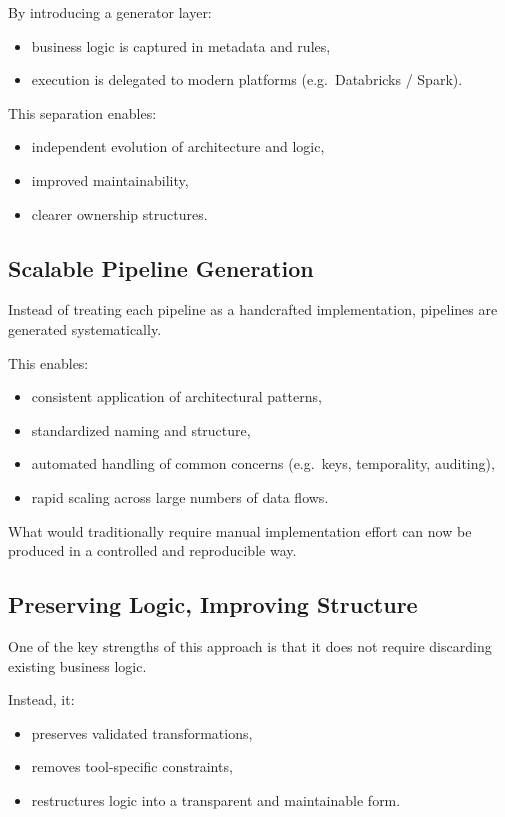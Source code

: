 \documentclass[11pt,a4paper]{article}
\begin{document}
By introducing a generator layer:
\begin{itemize}
  \item business logic is captured in metadata and rules,
  \item execution is delegated to modern platforms (e.g.\ Databricks / Spark).
\end{itemize}

This separation enables:
\begin{itemize}
  \item independent evolution of architecture and logic,
  \item improved maintainability,
  \item clearer ownership structures.
\end{itemize}

\subsection{Scalable Pipeline Generation}

Instead of treating each pipeline as a handcrafted implementation, pipelines are generated systematically.

This enables:
\begin{itemize}
  \item consistent application of architectural patterns,
  \item standardized naming and structure,
  \item automated handling of common concerns (e.g.\ keys, temporality, auditing),
  \item rapid scaling across large numbers of data flows.
\end{itemize}

What would traditionally require manual implementation effort can now be produced in a controlled and reproducible way.

\subsection{Preserving Logic, Improving Structure}

One of the key strengths of this approach is that it does not require discarding existing business logic.

Instead, it:
\begin{itemize}
  \item preserves validated transformations,
  \item removes tool-specific constraints,
  \item restructures logic into a transparent and maintainable form.
\end{itemize}
\end{document}
